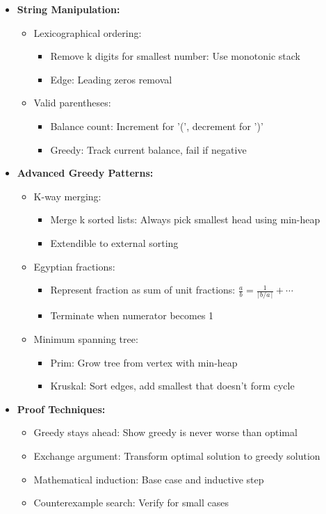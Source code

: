 \documentclass[a4paper,10pt]{book}
\begin{document}
\begin{itemize}
    \item \textbf{String Manipulation:}
    \begin{itemize}
        \item Lexicographical ordering:
        \begin{itemize}
            \item Remove k digits for smallest number: Use monotonic stack
            \item Edge: Leading zeros removal
        \end{itemize}
        \item Valid parentheses:
        \begin{itemize}
            \item Balance count: Increment for '(', decrement for ')'
            \item Greedy: Track current balance, fail if negative
        \end{itemize}
    \end{itemize}
    
    \item \textbf{Advanced Greedy Patterns:}
    \begin{itemize}
        \item K-way merging:
        \begin{itemize}
            \item Merge k sorted lists: Always pick smallest head using min-heap
            \item Extendible to external sorting
        \end{itemize}
        \item Egyptian fractions:
        \begin{itemize}
            \item Represent fraction as sum of unit fractions: $\frac{a}{b} = \frac{1}{\lceil b/a \rceil} + \cdots$
            \item Terminate when numerator becomes 1
        \end{itemize}
        \item Minimum spanning tree:
        \begin{itemize}
            \item Prim: Grow tree from vertex with min-heap
            \item Kruskal: Sort edges, add smallest that doesn't form cycle
        \end{itemize}
    \end{itemize}
    
    \item \textbf{Proof Techniques:}
    \begin{itemize}
        \item Greedy stays ahead: Show greedy is never worse than optimal
        \item Exchange argument: Transform optimal solution to greedy solution
        \item Mathematical induction: Base case and inductive step
        \item Counterexample search: Verify for small cases
    \end{itemize}
    

\end{itemize}
\end{document}
